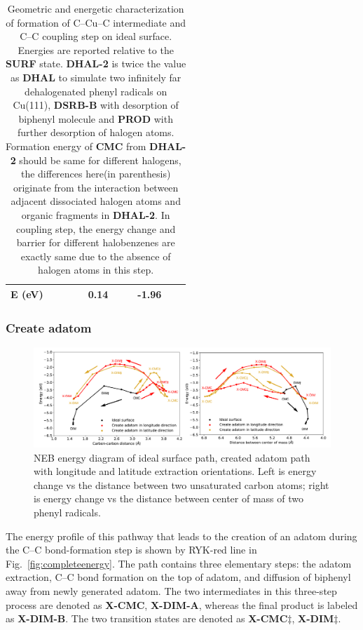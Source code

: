 \documentclass[%
 reprint,
 amsmath,amssymb,
 aps,
prb,
floatfix,
]{revtex4-2}
\newcommand{\lock}{\color{red}}
\newcommand{\lock}{\color{red}}
\begin{document}
\begin{table}
\begin{tabular}{ lccccccccc  }
 \hline
 E (\si{\electronvolt})~\cite{jacs2013} & & & & 0.14 & & & -1.96 & &\\
 \hline
 \hline
\end{tabular}
\caption{Geometric and energetic characterization of formation of C--Cu--C intermediate and C--C coupling step on ideal surface. Energies are reported relative to the \textbf{SURF} state. \textbf{DHAL-2} is twice the value as \textbf{DHAL} to simulate two infinitely far dehalogenated phenyl radicals on Cu(111), \textbf{DSRB-B} with desorption of biphenyl molecule and \textbf{PROD} with further desorption of halogen atoms. Formation energy of \textbf{CMC} from \textbf{DHAL-2} should be same for different halogens, the differences here(in parenthesis) originate from the interaction between adjacent dissociated halogen atoms and organic fragments in \textbf{DHAL-2}. In coupling step, the energy change and barrier for different halobenzenes are exactly same due to the absence of halogen atoms in this step.}
\label{table:idealsurface}
\end{table}


\subsubsection{Create adatom}

\begin{figure}[hbt]
\centering
\includegraphics[width=1.0\textwidth]{Fig/distance-energy.pdf}
\caption{NEB energy diagram of ideal surface path, created adatom path with longitude and latitude extraction orientations. Left is energy change vs the distance between two unsaturated carbon atoms; right is energy change vs the distance between center of mass of two phenyl radicals.}
\label{fig:distance-energy}
\end{figure}

{\lock
The energy profile of this pathway that leads to the creation of an adatom during the C--C bond-formation step is shown by RYK-red line in Fig.~\ref{fig:completeenergy}. The path contains three elementary steps: the adatom extraction, C--C bond formation on the top of adatom, and diffusion of biphenyl away from newly generated adatom. The two intermediates in this three-step process are denoted as \textbf{X-CMC}, \textbf{X-DIM-A}, whereas the final product is labeled as \textbf{X-DIM-B}. The two transition states are denoted as \textbf{X-CMC$\ddagger$}, \textbf{X-DIM$\ddagger$}.
}
\end{document}

